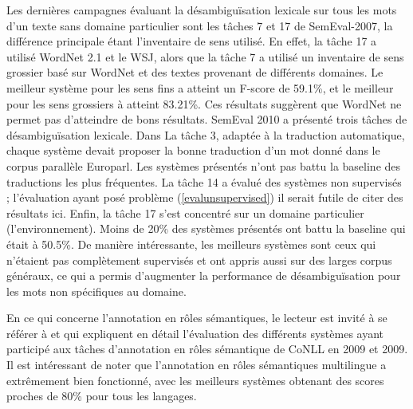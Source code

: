 Les dernières campagnes évaluant la désambiguïsation lexicale sur tous les mots
d'un texte sans domaine particulier sont les tâches 7 et 17 de SemEval-2007, la
différence principale étant l'inventaire de sens utilisé. En effet, la tâche 17
a utilisé WordNet 2.1 et le WSJ, alors que la tâche 7 a utilisé un inventaire
de sens grossier basé sur WordNet et des textes provenant de différents
domaines. Le meilleur système pour les sens fins a atteint un F-score de
59.1\%, et le meilleur pour les sens grossiers à atteint 83.21\%. Ces résultats
suggèrent que WordNet ne permet pas d'atteindre de bons résultats. SemEval 2010
a présenté trois tâches de désambiguïsation lexicale. Dans La tâche 3, adaptée
à la traduction automatique, chaque système devait proposer la bonne traduction
d'un mot donné dans le corpus parallèle Europarl. Les systèmes présentés n'ont
pas battu la baseline des traductions les plus fréquentes. La tâche 14 a évalué
des systèmes non supervisés ; l'évaluation ayant posé problème
(\ref{evalunsupervised}) il serait futile de citer des résultats ici. Enfin, la
tâche 17 s'est concentré sur un domaine particulier (l'environnement). Moins de
20\% des systèmes présentés ont battu la baseline qui était à 50.5\%. De
manière intéressante, les meilleurs systèmes sont ceux qui n'étaient pas
complètement supervisés et ont appris aussi sur des larges corpus généraux, ce
qui a permis d'augmenter la performance de désambiguïsation pour les mots non
spécifiques au domaine.

En ce qui concerne l'annotation en rôles sémantiques, le lecteur est invité à
se référer à \citep{surdeanu2008conll} et \citep{hajic2009conll} qui expliquent
en détail l'évaluation des différents systèmes ayant participé aux tâches
d'annotation en rôles sémantique de CoNLL en 2009 et 2009. Il est intéressant
de noter que l'annotation en rôles sémantiques multilingue a extrêmement bien
fonctionné, avec les meilleurs systèmes obtenant des scores proches de 80\%
pour tous les langages.


